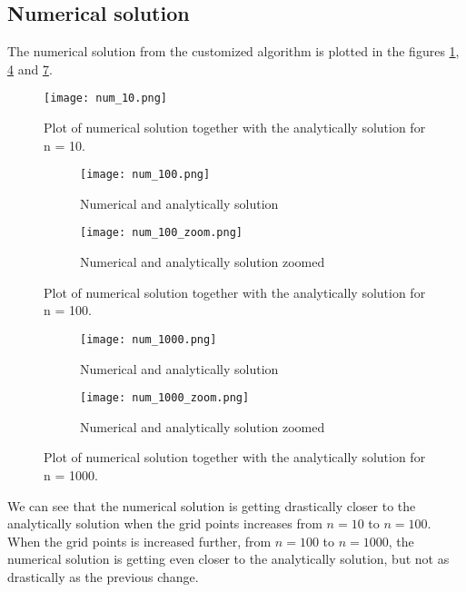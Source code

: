 \documentclass[12pt]{article}
\begin{document}
\begin{flushleft}
\newpage
\subsection*{Numerical solution}
The numerical solution from the customized algorithm is plotted in the figures \ref{fig:num_10}, \ref{fig:num_100} and \ref{fig:num_1000}.
\vspace{5mm}
\begin{figure}[h!]
\centering
\texttt{[image: num\_10.png]}
\caption{\label{fig:num_10}Plot of numerical solution together with the analytically solution for n = 10.}
\end{figure}

\begin{figure}[h!]
	\centering
	\begin{subfigure}{.5\textwidth}
 		\centering
 		\texttt{[image: num\_100.png]}
  		\caption{Numerical and analytically solution}
  		\label{fig:num_100_}
	\end{subfigure}%
	\begin{subfigure}{.5\textwidth}
  		\centering
  		\texttt{[image: num\_100\_zoom.png]}
  		\caption{Numerical and analytically solution zoomed}
  		\label{fig:num_100_zoom}
	\end{subfigure}
	\caption{Plot of numerical solution together with the analytically solution for n = 100.}
	\label{fig:num_100}
\end{figure}

\vspace{10mm}

\begin{figure}[h!]
	\centering
	\begin{subfigure}{.5\textwidth}
 		\centering
 		\texttt{[image: num\_1000.png]}
  		\caption{Numerical and analytically solution}
  		\label{fig:num_1000_}
	\end{subfigure}%
	\begin{subfigure}{.5\textwidth}
  		\centering
  		\texttt{[image: num\_1000\_zoom.png]}
  		\caption{Numerical and analytically solution zoomed}
  		\label{fig:num_1000_zoom}
	\end{subfigure}
	\caption{Plot of numerical solution together with the analytically solution for n = 1000.}
	\label{fig:num_1000}
\end{figure}

\newpage
We can see that the numerical solution is getting drastically closer to the analytically solution when the grid points increases from $n=10$ to $n=100$. When the grid points is increased further, from $n=100$ to $n = 1000$, the numerical solution is getting even closer to the analytically solution, but not as drastically as the previous change.



\end{flushleft}
\end{document}
